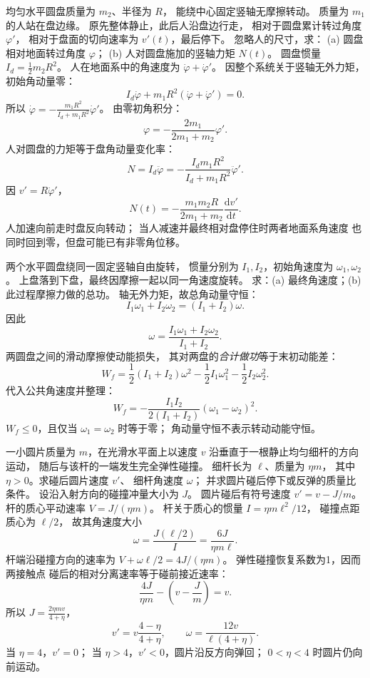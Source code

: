 均匀水平圆盘质量为 $m_2$、半径为 $R$，
能绕中心固定竖轴无摩擦转动。
质量为 $m_1$ 的人站在盘边缘。
原先整体静止，此后人沿盘边行走，
相对于圆盘累计转过角度 $\varphi'$，
相对于盘面的切向速率为 $v'(t)$，最后停下。
忽略人的尺寸，求：
(a) 圆盘相对地面转过角度 $\varphi$；
(b) 人对圆盘施加的竖轴力矩 $N(t)$。
\exsolution
圆盘惯量
$I_d=\frac12m_2R^2$。
人在地面系中的角速度为
$\dot\varphi+\dot\varphi'$。
因整个系统关于竖轴无外力矩，初始角动量零：
\[
I_d\dot\varphi+
m_1R^2(\dot\varphi+\dot\varphi')=0.
\]
所以
$\dot\varphi=
-\frac{m_1R^2}{I_d+m_1R^2}\dot\varphi'$。
由零初角积分：
\[
\boxed{\varphi=-\frac{2m_1}{2m_1+m_2}\varphi'}.
\]
人对圆盘的力矩等于盘角动量变化率：
\[
N=I_d\ddot\varphi
=-\frac{I_d m_1R^2}{I_d+m_1R^2}\ddot\varphi'.
\]
因 $v'=R\dot\varphi'$，
\[
\boxed{N(t)=-\frac{m_1m_2R}{2m_1+m_2}
\frac{\mathrm dv'}{\mathrm dt}}.
\]
\excheck 人加速向前走时盘反向转动；
当人减速并最终相对盘停住时两者地面系角速度
也同时回到零，但盘可能已有非零角位移。

两个水平圆盘绕同一固定竖轴自由旋转，
惯量分别为 $I_1,I_2$，初始角速度为
$\omega_1,\omega_2$。
上盘落到下盘，最终因摩擦一起以同一角速度旋转。
求：(a) 最终角速度；(b) 此过程摩擦力做的总功。
\exsolution
轴无外力矩，故总角动量守恒：
\[
I_1\omega_1+I_2\omega_2=(I_1+I_2)\omega.
\]
因此
\[
\boxed{\omega=\frac{I_1\omega_1+I_2\omega_2}{I_1+I_2}}.
\]
两圆盘之间的滑动摩擦使动能损失，
其对两盘的\emph{合计做功}等于末初动能差：
\[
W_f=\frac12(I_1+I_2)\omega^2
-\frac12I_1\omega_1^2-\frac12I_2\omega_2^2.
\]
代入公共角速度并整理：
\[
\boxed{W_f=-\frac{I_1I_2}{2(I_1+I_2)}
(\omega_1-\omega_2)^2}.
\]
\excheck $W_f\le0$，且仅当
$\omega_1=\omega_2$ 时等于零；
角动量守恒不表示转动动能守恒。

一小圆片质量为 $m$，在光滑水平面上以速度 $v$
沿垂直于一根静止均匀细杆的方向运动，
随后与该杆的一端发生完全弹性碰撞。
细杆长为 $\ell$、质量为 $\eta m$，
其中 $\eta>0$。求碰后圆片速度 $v'$、
细杆角速度 $\omega$；
并求圆片碰后停下或反弹的质量比条件。
\exsolution
设沿入射方向的碰撞冲量大小为 $J$。
圆片碰后有符号速度
$v'=v-J/m$。
杆的质心平动速率
$V=J/(\eta m)$。
杆关于质心的惯量
$I=\eta m\ell^2/12$，
碰撞点距质心为 $\ell/2$，
故其角速度大小
\[
\omega=\frac{J(\ell/2)}{I}
=\frac{6J}{\eta m\ell}.
\]
杆端沿碰撞方向的速率为
$V+\omega\ell/2=4J/(\eta m)$。
弹性碰撞恢复系数为1，因而两接触点
碰后的相对分离速率等于碰前接近速率：
\[
\frac{4J}{\eta m}-\left(v-\frac Jm\right)=v.
\]
所以 $J=\frac{2\eta m v}{4+\eta}$，
\[
\boxed{v'=v\frac{4-\eta}{4+\eta}},
\qquad
\boxed{\omega=\frac{12v}{\ell(4+\eta)}}.
\]
\excheck 当 $\eta=4$，$v'=0$；
当 $\eta>4$，$v'<0$，圆片沿反方向弹回；
$0<\eta<4$ 时圆片仍向前运动。

